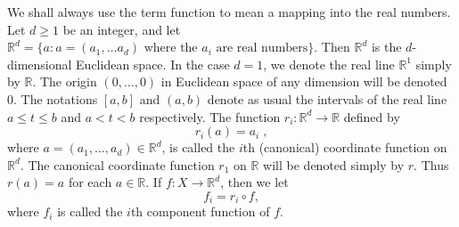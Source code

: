 We shall always use the term function to mean a mapping into the real numbers.
Let  $ d \geq 1 $ be an integer, and let
$  \mathbb{R}^d = \{a: a = (a_1, \ldots a_d) \text{ where the } a_i \text{ are real numbers}\}  $.
Then $\mathbb{R}^d$ is the $d$-dimensional Euclidean space. In the case $d=1$,
we denote the real line $\mathbb{R}^1$ simply by $\mathbb{R}$. The origin
$(0,\ldots,0)$ in Euclidean space of any dimension will be denoted 0. The
notations $[a,b]$ and $(a,b)$ denote as usual the intervals of the real
line $a\leq t\leq b$ and $a<t<b$ respectively. The function
$r_i\colon\mathbb{R}^d\to\mathbb{R}$ defined by 
\[
	r_{i}(a)=a_{i}\;,
\]
where  $ a = (a_1, \ldots, a_d) \in \mathbb{R}^d $, is called the  $ i $th (canonical) coordinate function on  $ \mathbb{R}^d $.
The canonical coordinate function  $ r_1 $ on  $ \mathbb{R} $ will be denoted simply
by  $ r $. Thus  $ r(a) = a $ for each  $ a \in \mathbb{R} $. If  $ f: X \to \mathbb{R}^d $, then we let
\[
	f_{i}=r_{i}\circ f,
\]
where $f_{i}$ is called the $i$th component function of $f$.

